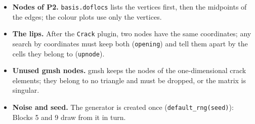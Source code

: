 \begin{itemize}[itemsep=1pt]
\item \textbf{Nodes of P2.} \texttt{basis.doflocs} lists the vertices first,
then the midpoints of the edges; the colour plots use only the vertices.
\item \textbf{The lips.} After the \texttt{Crack} plugin, two nodes have the same
coordinates; any search by coordinates must keep both (\texttt{opening}) and
tell them apart by the cells they belong to (\texttt{upnode}).
\item \textbf{Unused gmsh nodes.} gmsh keeps the nodes of the
one-dimensional crack elements; they belong to no triangle and must be
dropped, or the matrix is singular.
\item \textbf{Noise and seed.} The generator is created once
(\texttt{default\_rng(seed)}): Blocks 5 and 9 draw from it in turn.
\end{itemize}


